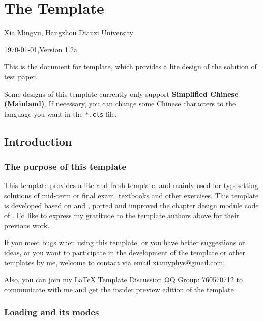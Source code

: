 \chapter{The  Template}
\fancyhead[R]{\color{H7}\rightmark\,}

\centerline{Xia Mingyu, \href{https://www.hdu.edu.cn}{Hangzhou Dianzi University}}
\yyyymmdddate
\centerline{}
\centerline{\today,\quad Version 1.2a}

This is the document for  template, which provides a lite design of the solution of test paper.

Some designs of this template currently only support \textbf{Simplified Chinese (Mainland)}. If necessary, you can change some Chinese characters to the language you want in the \verb|*.cls| file.

\section{Introduction}
\subsection{The purpose of this template}
This template provides a lite and fresh template, and mainly used for typesetting solutions of mid-term or final exam, textbooks and other exercises. This template is developed based on  and \href{https://github.com/Azure1210/VividBooK}{}, ported and improved the chapter design module code of \href{https://www.overleaf.com/latex/templates/the-legrand-orange-book-template-english/jtctyfmnpppc}{}. I'd like to express my gratitude to the template authors above for their previous work.

If you meet bugs when using this template, or you have better suggestions or ideas, or you want to participate in the development of the template or other templates by me, welcome to contact via email \href{mailto:xiamyphys@gmail.com}{xiamyphys@gmail.com}.

Also, you can join my \textsf\LaTeX{} Template Discussion \href{https://qm.qq.com/q/OnHzbNvVAG}{QQ Group: 760570712} to communicate with me and get the insider preview edition of the template.

\subsection{Loading  and its modes}

